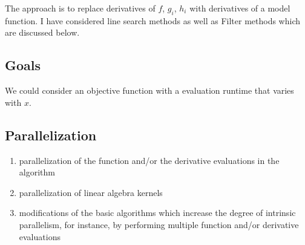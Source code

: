 \documentclass{article}
\begin{document}
The approach is to replace derivatives of $f$, $g_i$, $h_i$ with derivatives of a model function.
I have considered line search methods as well as Filter methods which are discussed below.


\subsection{Goals}
We could consider an objective function with a evaluation runtime that varies with $x$.


%
%



\subsection{Parallelization}



\begin{enumerate}
\item parallelization of the function and/or the derivative evaluations in the algorithm
\item parallelization of linear algebra kernels
\item modifications of the basic algorithms which increase the degree of intrinsic parallelism, for instance, by performing multiple function and/or derivative evaluations
\end{enumerate}
\end{document}
